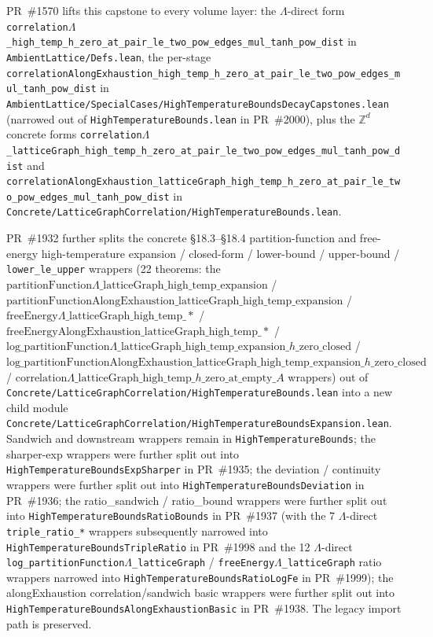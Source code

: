 \documentclass[a4paper,11pt]{article}
\newcommand{\LeanLambda}{\texorpdfstring{\ensuremath{\Lambda}}{Lambda}}
\begin{document}
PR~\#1570 lifts this capstone to every volume layer: the
$\Lambda$-direct form
\texttt{correlation\LeanLambda\_high\_temp\_h\_zero\_at\_pair\_le\_two\_pow\_edges\_mul\_tanh\_pow\_dist}
in \texttt{AmbientLattice/Defs.lean}, the per-stage
\texttt{correlationAlongExhaustion\_high\_temp\_h\_zero\_at\_pair\_le\_two\_pow\_edges\_mul\_tanh\_pow\_dist}
in
\texttt{AmbientLattice/SpecialCases/HighTemperatureBoundsDecayCapstones.lean}
(narrowed out of \texttt{HighTemperatureBounds.lean} in PR~\#2000),
plus the $\mathbb{Z}^d$ concrete forms
\texttt{correlation\LeanLambda\_latticeGraph\_high\_temp\_h\_zero\_at\_pair\_le\_two\_pow\_edges\_mul\_tanh\_pow\_dist}
and
\texttt{correlationAlongExhaustion\_latticeGraph\_high\_temp\_h\_zero\_at\_pair\_le\_two\_pow\_edges\_mul\_tanh\_pow\_dist}
in \texttt{Concrete/LatticeGraphCorrelation/HighTemperatureBounds.lean}.

PR~\#1932 further splits the concrete §18.3--§18.4 partition-function and
free-energy high-temperature expansion / closed-form / lower-bound /
upper-bound / \texttt{lower\_le\_upper} wrappers (22 theorems: the
$\mathrm{partitionFunction}\Lambda\_\mathrm{latticeGraph}\_\mathrm{high}\_\mathrm{temp}\_\mathrm{expansion}$ /
$\mathrm{partitionFunctionAlongExhaustion}\_\mathrm{latticeGraph}\_\mathrm{high}\_\mathrm{temp}\_\mathrm{expansion}$ /
$\mathrm{freeEnergy}\Lambda\_\mathrm{latticeGraph}\_\mathrm{high}\_\mathrm{temp}\_*$ /
$\mathrm{freeEnergyAlongExhaustion}\_\mathrm{latticeGraph}\_\mathrm{high}\_\mathrm{temp}\_*$ /
$\mathrm{log}\_\mathrm{partitionFunction}\Lambda\_\mathrm{latticeGraph}\_\mathrm{high}\_\mathrm{temp}\_\mathrm{expansion}\_h\_\mathrm{zero}\_\mathrm{closed}$ /
$\mathrm{log}\_\mathrm{partitionFunctionAlongExhaustion}\_\mathrm{latticeGraph}\_\mathrm{high}\_\mathrm{temp}\_\mathrm{expansion}\_h\_\mathrm{zero}\_\mathrm{closed}$ /
$\mathrm{correlation}\Lambda\_\mathrm{latticeGraph}\_\mathrm{high}\_\mathrm{temp}\_h\_\mathrm{zero}\_\mathrm{at}\_\mathrm{empty}\_A$ wrappers) out of
\texttt{Concrete/LatticeGraphCorrelation/HighTemperatureBounds.lean} into a
new child module
\texttt{Concrete/LatticeGraphCorrelation/HighTemperatureBoundsExpansion.lean}.
Sandwich and downstream wrappers remain in
\texttt{HighTemperatureBounds}; the sharper-exp wrappers were further
split out into \texttt{HighTemperatureBoundsExpSharper} in PR~\#1935;
the deviation / continuity wrappers were further split out into
\texttt{HighTemperatureBoundsDeviation} in PR~\#1936; the
ratio\_sandwich / ratio\_bound wrappers were further split out into
\texttt{HighTemperatureBoundsRatioBounds} in PR~\#1937 (with the 7
$\Lambda$-direct \texttt{triple\_ratio\_*} wrappers subsequently
narrowed into \texttt{HighTemperatureBoundsTripleRatio} in PR~\#1998
and the 12 $\Lambda$-direct
\texttt{log\_partitionFunction\LeanLambda\_latticeGraph} /
\texttt{freeEnergy\LeanLambda\_latticeGraph} ratio wrappers narrowed into
\texttt{HighTemperatureBoundsRatioLogFe} in PR~\#1999); the
alongExhaustion correlation/sandwich basic wrappers
were further split out into
\texttt{HighTemperatureBoundsAlongExhaustionBasic} in PR~\#1938.
The legacy import path is preserved.
\end{document}
